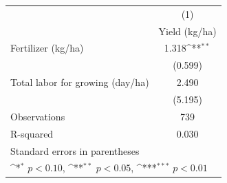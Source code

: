 {
\def\sym#1{\ifmmode^{#1}\else\(^{#1}\)\fi}
\begin{tabular}{l*{1}{c}}
\toprule
                    &\multicolumn{1}{c}{(1)}\\
                    &\multicolumn{1}{c}{Yield (kg/ha)}\\
\midrule
Fertilizer (kg/ha)  &       1.318\sym{**} \\
                    &     (0.599)         \\
\addlinespace
Total labor for growing (day/ha)&       2.490         \\
                    &     (5.195)         \\
\midrule
Observations        &         739         \\
R-squared           &       0.030         \\
\bottomrule
\multicolumn{2}{l}{\footnotesize Standard errors in parentheses}\\
\multicolumn{2}{l}{\footnotesize \sym{*} \(p<0.10\), \sym{**} \(p<0.05\), \sym{***} \(p<0.01\)}\\
\end{tabular}
}
